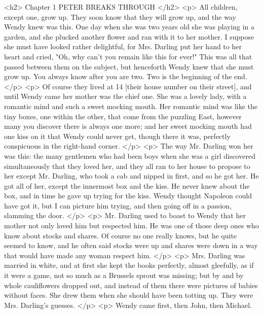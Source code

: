     <h2>
      Chapter 1 PETER BREAKS THROUGH
    </h2>
    <p>
      All children, except one, grow up. They soon know that they will grow up,
      and the way Wendy knew was this. One day when she was two years old she
      was playing in a garden, and she plucked another flower and ran with it to
      her mother. I suppose she must have looked rather delightful, for Mrs.
      Darling put her hand to her heart and cried, "Oh, why can't you remain
      like this for ever!" This was all that passed between them on the subject,
      but henceforth Wendy knew that she must grow up. You always know after you
      are two. Two is the beginning of the end.
    </p>
    <p>
      Of course they lived at 14 [their house number on their street], and until
      Wendy came her mother was the chief one. She was a lovely lady, with a
      romantic mind and such a sweet mocking mouth. Her romantic mind was like
      the tiny boxes, one within the other, that come from the puzzling East,
      however many you discover there is always one more; and her sweet mocking
      mouth had one kiss on it that Wendy could never get, though there it was,
      perfectly conspicuous in the right-hand corner.
    </p>
    <p>
      The way Mr. Darling won her was this: the many gentlemen who had been boys
      when she was a girl discovered simultaneously that they loved her, and
      they all ran to her house to propose to her except Mr. Darling, who took a
      cab and nipped in first, and so he got her. He got all of her, except the
      innermost box and the kiss. He never knew about the box, and in time he
      gave up trying for the kiss. Wendy thought Napoleon could have got it, but
      I can picture him trying, and then going off in a passion, slamming the
      door.
    </p>
    <p>
      Mr. Darling used to boast to Wendy that her mother not only loved him but
      respected him. He was one of those deep ones who know about stocks and
      shares. Of course no one really knows, but he quite seemed to know, and he
      often said stocks were up and shares were down in a way that would have
      made any woman respect him.
    </p>
    <p>
      Mrs. Darling was married in white, and at first she kept the books
      perfectly, almost gleefully, as if it were a game, not so much as a
      Brussels sprout was missing; but by and by whole cauliflowers dropped out,
      and instead of them there were pictures of babies without faces. She drew
      them when she should have been totting up. They were Mrs. Darling's
      guesses.
    </p>
    <p>
      Wendy came first, then John, then Michael.

